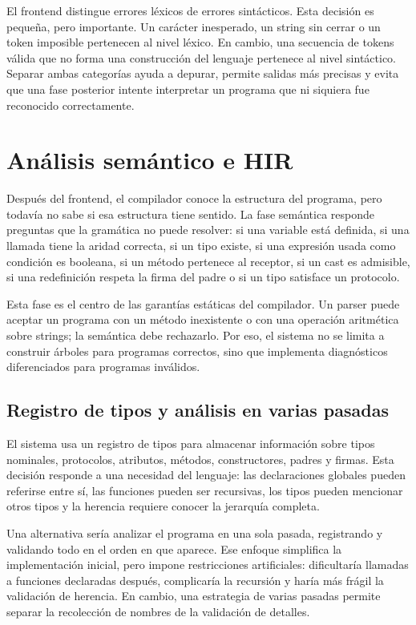 \documentclass[12pt,letterpaper]{article}
\begin{document}
El frontend distingue errores léxicos de errores sintácticos. Esta decisión es pequeña, pero importante. Un carácter inesperado, un string sin cerrar o un token imposible pertenecen al nivel léxico. En cambio, una secuencia de tokens válida que no forma una construcción del lenguaje pertenece al nivel sintáctico. Separar ambas categorías ayuda a depurar, permite salidas más precisas y evita que una fase posterior intente interpretar un programa que ni siquiera fue reconocido correctamente.

\section{Análisis semántico e HIR}

Después del frontend, el compilador conoce la estructura del programa, pero todavía no sabe si esa estructura tiene sentido. La fase semántica responde preguntas que la gramática no puede resolver: si una variable está definida, si una llamada tiene la aridad correcta, si un tipo existe, si una expresión usada como condición es booleana, si un método pertenece al receptor, si un cast es admisible, si una redefinición respeta la firma del padre o si un tipo satisface un protocolo.

Esta fase es el centro de las garantías estáticas del compilador. Un parser puede aceptar un programa con un método inexistente o con una operación aritmética sobre strings; la semántica debe rechazarlo. Por eso, el sistema no se limita a construir árboles para programas correctos, sino que implementa diagnósticos diferenciados para programas inválidos.

\subsection{Registro de tipos y análisis en varias pasadas}

El sistema usa un registro de tipos para almacenar información sobre tipos nominales, protocolos, atributos, métodos, constructores, padres y firmas. Esta decisión responde a una necesidad del lenguaje: las declaraciones globales pueden referirse entre sí, las funciones pueden ser recursivas, los tipos pueden mencionar otros tipos y la herencia requiere conocer la jerarquía completa.

Una alternativa sería analizar el programa en una sola pasada, registrando y validando todo en el orden en que aparece. Ese enfoque simplifica la implementación inicial, pero impone restricciones artificiales: dificultaría llamadas a funciones declaradas después, complicaría la recursión y haría más frágil la validación de herencia. En cambio, una estrategia de varias pasadas permite separar la recolección de nombres de la validación de detalles.
\end{document}

